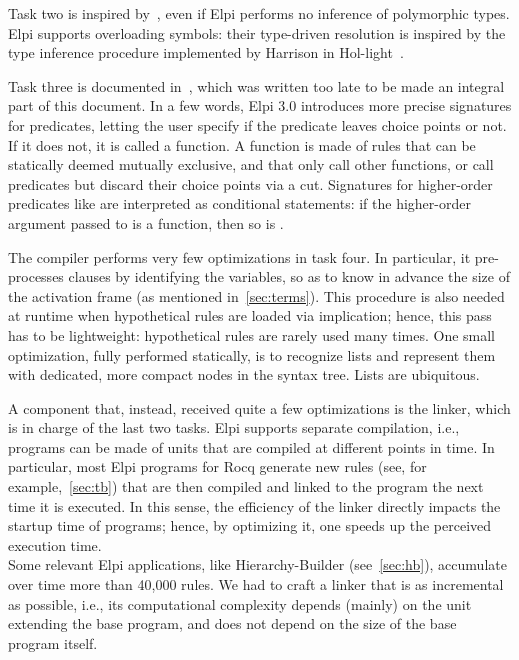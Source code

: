 \documentclass{these-ISSS}
\begin{document}
Task two is inspired by~\cite{10.5555/868728}, even if Elpi performs no
inference of polymorphic types. Elpi supports overloading symbols: their
type-driven resolution is inspired by the type inference procedure implemented
by Harrison in Hol-light~\cite{10.1007/978-3-642-03359-9_4}.


Task three is documented in~\cite{elpidet}, which was written too late to be
made an integral part of this document. In a few words, Elpi 3.0 introduces
more precise signatures for predicates, letting the user specify if the
predicate leaves choice points or not. If it does not, it is called a function.
A function is made of rules that can be statically deemed mutually exclusive,
and that only call other functions, or call predicates but discard their choice
points via a cut. Signatures for higher-order predicates like  are
interpreted as conditional statements: if the higher-order argument 
passed to  is a function, then so is .


The compiler performs very few optimizations in task four. In particular, it
pre-processes clauses by identifying the variables, so as to know in advance
the size of the activation frame (as mentioned in~\cref{sec:terms}). This
procedure is also needed at runtime when hypothetical rules are loaded via
implication; hence, this pass has to be lightweight: hypothetical rules are
rarely used many times. One small optimization, fully performed statically, is
to recognize lists and represent them with dedicated, more compact nodes in
the syntax tree. Lists are ubiquitous.


A component that, instead, received quite a few optimizations is the linker,
which is in charge of the last two tasks. Elpi supports separate compilation,
i.e., programs can be made of units that are compiled at different points in
time. In particular, most Elpi programs for Rocq generate new rules (see, for
example,~\cref{sec:tb}) that are then compiled and linked to the program the
next time it is executed. In this sense, the efficiency of the linker directly
impacts the startup time of programs; hence, by optimizing it, one speeds
up the perceived execution time.\\
Some relevant Elpi applications, like Hierarchy-Builder (see~\cref{sec:hb}),
accumulate over time more than 40,000 rules. We had to craft a linker that is
as incremental as possible, i.e., its computational complexity depends (mainly)
on the unit extending the base program, and does not depend on the size of the
base program itself.
\end{document}
